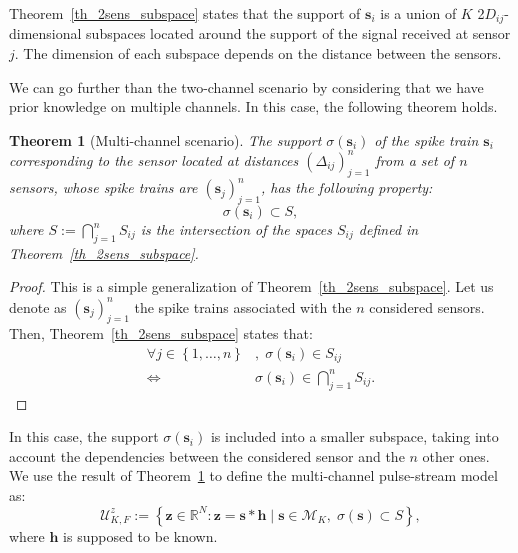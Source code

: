 \documentclass{article}
\newtheorem{theorem}{Theorem}
\newcommand{\vect}[1]{\bm{#1}}
\theoremstyle{definition}
\begin{document}
Theorem~\ref{th_2sens_subspace} states that the support of $\vect{s}_i$ is a union of $K$ \num{2}$D_{ij}$-dimensional subspaces located around the support of the signal received at sensor $j$. The dimension of each subspace depends on the distance between the sensors. 

We can go further than the two-channel scenario by considering that we have prior knowledge on multiple channels. In this case, the following theorem holds.
\begin{theorem}[Multi-channel scenario]
	\label{th_multisens_subspace}
	 The support $\sigma \left(\vect{s}_i\right)$ of the spike train $\vect{s}_i$ corresponding to the sensor located at distances $\left(\Delta_{ij}\right)_{j=1}^n$ from a set of $n$ sensors, whose spike trains are $\left(\vect{s}_j\right)_{j=1}^n$, has the following property:
	\begin{equation*}
	\sigma \left(\vect{s}_i\right) \subset S,
	\end{equation*}
	where $S := \bigcap \limits_{j=1}^{n} S_{ij} $ is the intersection of the spaces $S_{ij}$ defined in Theorem~\ref{th_2sens_subspace}.
\end{theorem}
\begin{proof}
	This is a simple generalization of Theorem~\ref{th_2sens_subspace}. Let us denote as $\left(\vect{s}_j\right)_{j=1}^n$ the spike trains associated with the $n$ considered sensors.
	Then, Theorem~\ref{th_2sens_subspace} states that:
	\begin{align*}
	 \forall j \in \left\lbrace 1,\dots,n \right \rbrace &, \; \sigma \left(\vect{s}_i\right) \in S_{ij}\\
	 \Leftrightarrow &  \sigma \left(\vect{s}_i\right) \in \bigcap \limits_{j=1}^{n} S_{ij}. 
	\end{align*} 
\end{proof}
In this case, the support $\sigma\left(\vect{s}_i\right)$ is included into a smaller subspace, taking into account the dependencies between the considered sensor and the $n$ other ones. 
We use the result of Theorem~\ref{th_multisens_subspace} to define the multi-channel pulse-stream model as:
\begin{equation}
\label{eq_pulse_USstream_model}
\mathcal{U}^z_{K,F}:=\left\lbrace \vect{z} \in \mathbb{R}^N: \vect{z} = \vect{s} \ast \vect{h} \; | \;\vect{s} \in \mathcal{M}_K, \; \sigma\left(\vect{s}\right) \subset S \right\rbrace,
\end{equation} 
where $\vect{h}$ is supposed to be known. 
\end{document}
